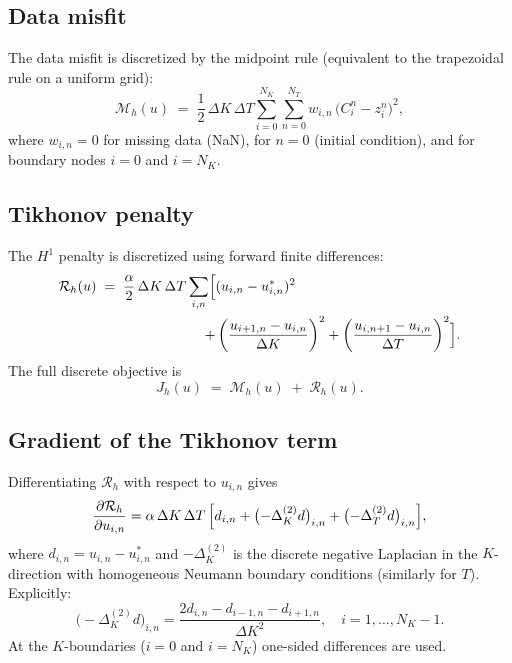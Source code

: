 \documentclass[11pt, a4paper]{article}
\newcommand{\dK}{\Delta K}
\newcommand{\dT}{\Delta T}
\newcommand{\pder}[2]{\frac{\partial #1}{\partial #2}}
\theoremstyle{definition}
\theoremstyle{plain}
\begin{document}
\subsection{Data misfit}

The data misfit is discretized by the midpoint rule (equivalent to the
trapezoidal rule on a uniform grid):
\begin{equation}\label{eq:misfit_disc}
  \mathcal{M}_h(u) \;=\;
  \frac{1}{2}\,\dK\,\dT
  \sum_{i=0}^{N_K}\sum_{n=0}^{N_T}
    w_{i,n}\,\bigl(C_i^n - z_i^n\bigr)^2,
\end{equation}
where $w_{i,n} = 0$ for missing data (NaN), for $n=0$ (initial condition),
and for boundary nodes $i=0$ and $i=N_K$.

\subsection{Tikhonov penalty}

The $H^1$ penalty is discretized using forward finite differences:
\begin{equation}\label{eq:tikhonov_disc}
\begin{split}
  \mathcal{R}_h(u) \;=\;
  \frac{\alpha}{2}\,\dK\,\dT
  \sum_{i,n} \Bigl[
    &(u_{i,n} - u^*_{i,n})^2 \\
    + &\left(\frac{u_{i+1,n} - u_{i,n}}{\dK}\right)^2
    + \left(\frac{u_{i,n+1} - u_{i,n}}{\dT}\right)^2
  \Bigr].
\end{split}
\end{equation}
The full discrete objective is
\begin{equation}\label{eq:Jalpha_disc}
  J_h(u) \;=\; \mathcal{M}_h(u) \;+\; \mathcal{R}_h(u).
\end{equation}

\subsection{Gradient of the Tikhonov term}

Differentiating $\mathcal{R}_h$ with respect to $u_{i,n}$ gives
\begin{equation}\label{eq:grad_R}
  \pder{\mathcal{R}_h}{u_{i,n}}
  = \alpha\,\dK\,\dT\,
  \Bigl[
    d_{i,n}
    + \bigl(-\Delta_K^{(2)} d\bigr)_{i,n}
    + \bigl(-\Delta_T^{(2)} d\bigr)_{i,n}
  \Bigr],
\end{equation}
where $d_{i,n} = u_{i,n} - u^*_{i,n}$ and $-\Delta_K^{(2)}$ is the
discrete negative Laplacian in the $K$-direction with homogeneous Neumann
boundary conditions (similarly for $T$). Explicitly:
\[
  \bigl(-\Delta_K^{(2)} d\bigr)_{i,n}
  = \frac{2d_{i,n} - d_{i-1,n} - d_{i+1,n}}{\dK^2},
  \quad i = 1, \ldots, N_K - 1.
\]
At the $K$-boundaries ($i=0$ and $i=N_K$) one-sided differences are used.
\end{document}
